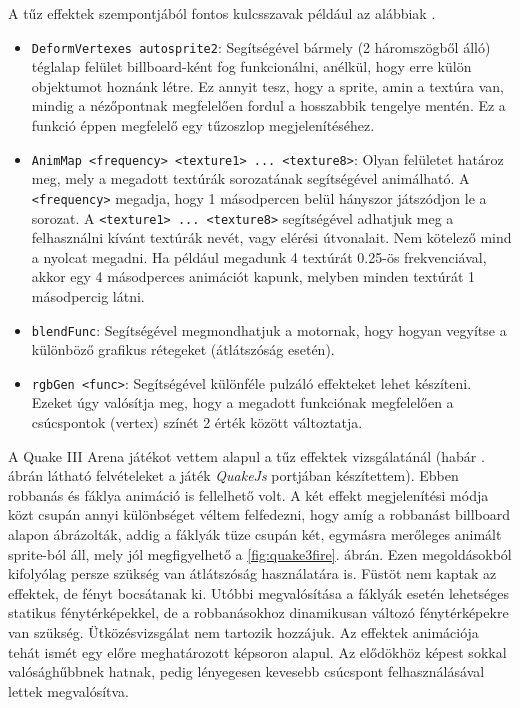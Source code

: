 A tűz effektek szempontjából fontos kulcsszavak például az alábbiak \cite{quake3shaderManual}.
\begin{itemize} 
\item
\texttt{DeformVertexes autosprite2}: Segítségével bármely (2 háromszögből álló) téglalap felület billboard-ként fog funkcionálni, anélkül, hogy erre külön objektumot hoznánk létre. Ez annyit tesz, hogy a sprite, amin a textúra van, mindig a nézőpontnak megfelelően fordul a hosszabbik tengelye mentén. Ez a funkció éppen megfelelő egy tűzoszlop megjelenítéséhez.
\item
\texttt{AnimMap <frequency> <texture1> ... <texture8>}: Olyan felületet határoz meg, mely a megadott textúrák sorozatának segítségével animálható. A \texttt{<frequency>} megadja, hogy 1 másodpercen belül hányszor játszódjon le a sorozat. A \texttt{<texture1> ... <texture8>} segítségével adhatjuk meg a felhasználni kívánt textúrák nevét, vagy elérési útvonalait. Nem kötelező mind a nyolcat megadni. Ha például megadunk 4 textúrát 0.25-ös frekvenciával, akkor egy 4 másodperces animációt kapunk, melyben minden textúrát 1 másodpercig látni. 
\item
\texttt{blendFunc}: Segítségével megmondhatjuk a motornak, hogy hogyan vegyítse a különböző grafikus rétegeket (átlátszóság esetén).
\item
\texttt{rgbGen <func>}: Segítségével különféle pulzáló effekteket lehet készíteni. Ezeket úgy valósítja meg, hogy a megadott funkciónak megfelelően a csúcspontok (vertex) színét 2 érték között változtatja.
\end{itemize}

A Quake III Arena játékot vettem alapul a tűz effektek vizsgálatánál (habár . ábrán látható felvételeket a játék \textit{QuakeJs} portjában készítettem). Ebben robbanás és fáklya animáció is fellelhető volt. A két effekt megjelenítési módja közt csupán annyi különbséget véltem felfedezni, hogy amíg a robbanást billboard alapon ábrázolták, addig a fáklyák tüze csupán két, egymásra merőleges animált sprite-ból áll, mely jól megfigyelhető a \ref{fig:quake3fire}. ábrán. Ezen megoldásokból kifolyólag persze szükség van átlátszóság használatára is. Füstöt nem kaptak az effektek, de fényt bocsátanak ki. Utóbbi megvalósítása a fáklyák esetén lehetséges statikus fénytérképekkel, de a robbanásokhoz dinamikusan változó fénytérképekre van szükség. Ütközésvizsgálat nem tartozik hozzájuk. Az effektek animációja tehát ismét egy előre meghatározott képsoron alapul. Az elődökhöz képest sokkal valósághűbbnek hatnak, pedig lényegesen kevesebb csúcspont felhasználásával lettek megvalósítva.

